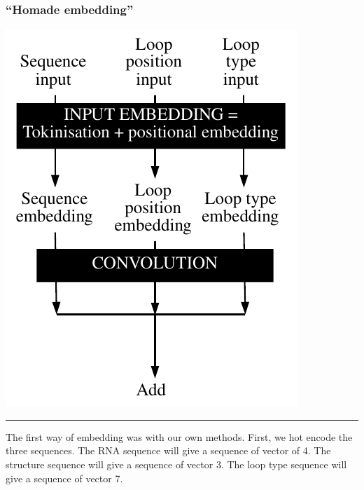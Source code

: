 \documentclass[12pt, oneside, a4paper]{report}
\begin{document}
\begin{multicols}{2}
\subsubsection{``Homade embedding''}
\begingroup
\centering
    \includegraphics[width=\columnwidth ]{figure/own_embedding.pdf}
        
    \small
    \vspace{0.5ex}
    
    \hrule height 1pt
    
    \vspace{1ex}
    
\endgroup

The first way of embedding was with our own methods. First, we hot encode the three sequences. The RNA sequence will give a sequence of vector of 4. The structure sequence will give a sequence of vector 3. The loop type sequence will give a sequence of vector 7.


\end{multicols}
\end{document}
